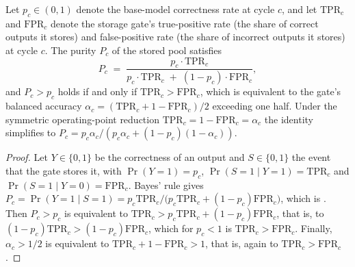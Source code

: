 \begin{proposition}
\label{thm:bayes-purity}
Let $p_c \in (0,1)$ denote the base-model correctness rate at cycle $c$, and let $\mathrm{TPR}_c$ and $\mathrm{FPR}_c$ denote the storage gate's true-positive rate (the share of correct outputs it stores) and false-positive rate (the share of incorrect outputs it stores) at cycle $c$. The purity $P_c$ of the stored pool satisfies
\begin{equation}
P_c \;=\; \frac{p_c \cdot \mathrm{TPR}_c}{p_c \cdot \mathrm{TPR}_c \;+\; (1-p_c) \cdot \mathrm{FPR}_c},
\label{eq:bayes-purity}
\end{equation}
and $P_c > p_c$ holds if and only if $\mathrm{TPR}_c > \mathrm{FPR}_c$, which is equivalent to the gate's balanced accuracy $\alpha_c = (\mathrm{TPR}_c + 1 - \mathrm{FPR}_c)/2$ exceeding one half. Under the symmetric operating-point reduction $\mathrm{TPR}_c = 1-\mathrm{FPR}_c = \alpha_c$ the identity simplifies to $P_c = p_c \alpha_c / (p_c \alpha_c + (1-p_c)(1-\alpha_c))$.
\end{proposition}

\begin{proof}
Let $Y \in \{0,1\}$ be the correctness of an output and $S \in \{0,1\}$ the event that the gate stores it, with $\Pr(Y=1) = p_c$, $\Pr(S=1 \mid Y=1) = \mathrm{TPR}_c$ and $\Pr(S=1 \mid Y=0) = \mathrm{FPR}_c$. Bayes' rule gives $P_c = \Pr(Y=1 \mid S=1) = p_c \mathrm{TPR}_c / \big(p_c \mathrm{TPR}_c + (1-p_c)\mathrm{FPR}_c\big)$, which is . Then $P_c > p_c$ is equivalent to $\mathrm{TPR}_c > p_c \mathrm{TPR}_c + (1-p_c)\mathrm{FPR}_c$, that is, to $(1-p_c)\mathrm{TPR}_c > (1-p_c)\mathrm{FPR}_c$, which for $p_c < 1$ is $\mathrm{TPR}_c > \mathrm{FPR}_c$. Finally, $\alpha_c > 1/2$ is equivalent to $\mathrm{TPR}_c + 1 - \mathrm{FPR}_c > 1$, that is, again to $\mathrm{TPR}_c > \mathrm{FPR}_c$.
\end{proof}

